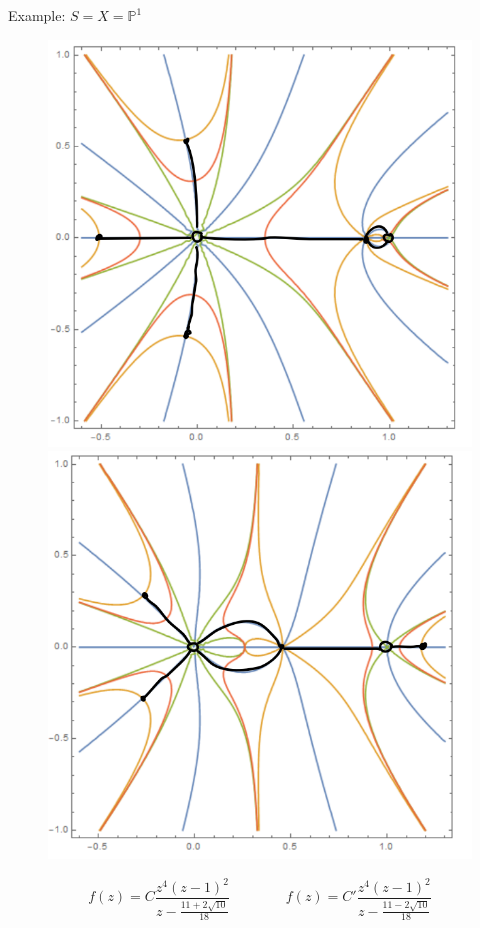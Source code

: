 \documentclass[pdf]{beamer}
\numberwithin{equation}{section}
\theoremstyle{plain}
\theoremstyle{plain}
\theoremstyle{remark}
\begin{document}
\begin{frame}{Example: $S=X=\mathbb{P}^1$}
\begin{figure}[th]
	\begin{minipage}[b]{.45\textwidth}
		\centering
		\includegraphics[width=.83\textwidth]{figures/f1=11+2.png}
	\end{minipage}
	\begin{minipage}[b]{.45\textwidth}
		\centering
		\includegraphics[width=.83\textwidth]{figures/f1=11-2.png}
	\end{minipage}
\end{figure}
$$\displaystyle f(z)=C\frac{z^4 (z-1)^2}{z-\frac{11+2\sqrt{10}}{18}}\qquad\qquad f(z)=C'\frac{z^4 (z-1)^2}{z-\frac{11-2\sqrt{10}}{18}}$$
\end{frame}
\end{document}
